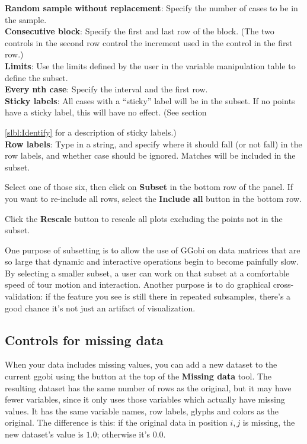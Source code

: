 \documentclass[11pt]{article}
\def\Widget#1{\textbf{#1}}
\begin{document}
\Widget{Random sample without replacement}:  Specify the number of
     cases to be in the sample.
\\\Widget{Consecutive block}:  Specify the first and last row of the block.
     (The two controls in the second row control the increment used
     in the control in the first row.)
\\\Widget{Limits}:  Use the limits defined by the user in the variable
     manipulation table to define the subset.
\\\Widget{Every nth case}:  Specify the interval and the first row.
\\\Widget{Sticky labels}:  All cases with a ``sticky'' label will
  be in the subset.  If no points have a sticky label, this
  will have no effect. (See section {\ref{slbl:Identify} for a description
  of sticky labels.)
\\\Widget{Row labels}: Type in a string, and specify where it should
  fall (or not fall) in the row labels, and whether case should
  be ignored.  Matches will be included in the subset.

Select one of those six, then click on \Widget{Subset} in the
bottom row of the panel.  If you want to re-include all rows, 
select the \Widget{Include all} button in the bottom row.

Click the \Widget{Rescale} button to rescale all plots excluding
the points not in the subset.

One purpose of subsetting is to allow the use of GGobi on data matrices
that are so large that dynamic and interactive operations begin to
become painfully slow.  By selecting a smaller subset, a user can
work on that subset at a comfortable speed of tour motion and
interaction.  Another purpose is to do graphical cross-validation:
if the feature you see is still there in repeated subsamples, there's
a good chance it's not just an artifact of visualization.

\subsection{Controls for missing data}

When your data includes missing values, you can add a new dataset to
the current ggobi using the button at the top of the \Widget{Missing
data} tool.  The resulting dataset has the same number of rows as the
original, but it may have fewer variables, since it only uses those
variables which actually have missing values.  It has the same
variable names, row labels, glyphs and colors as the original.  The
difference is this: if the original data in position $i,j$ is missing,
the new dataset's value is $1.0$; otherwise it's $0.0$.

}
\end{document}
